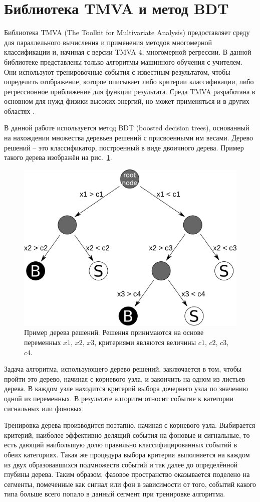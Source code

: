 \documentclass[14pt]{extarticle}
\begin{document}
\section{Библиотека TMVA и метод BDT}
Библиотека TMVA (The Toolkit for Multivariate Analysis) предоставляет среду для параллельного вычисления и применения методов многомерной классификации и, начиная с версии TMVA 4, многомерной регрессии. В данной библиотеке представлены только алгоритмы машинного обучения с учителем. Они используют тренировочные события с известным результатом, чтобы определить отображение, которое описывает либо критерии классификации, либо регрессионное приближение для функции результата. Среда TMVA разработана в основном для нужд физики высоких энергий, но может применяться и в других областях \cite{tmva4}.

В данной работе используется метод BDT (boosted decision trees), основанный на нахождении множества деревьев решений с присвоенными им весами. Дерево решений -- это классификатор, построенный в виде двоичного дерева. Пример такого дерева изображён на рис.~\ref{fig:dectree}.

\begin{figure}[h!]
	\centering
	\includegraphics[width=0.7\linewidth]{../pics/decision.png}
	\caption{Пример дерева решений. Решения принимаются на основе переменных $x1$, $x2$, $x3$, критериями являются величины $c1$, $c2$, $c3$, $c4$.}
	\label{fig:dectree}
\end{figure}

Задача алгоритма, использующего дерево решений, заключается в том, чтобы пройти это дерево, начиная с корневого узла, и закончить на одном из листьев дерева. В каждом узле находится критерий выбора дочернего узла по значению одной из переменных. В результате алгоритм относит событие к категории сигнальных или фоновых.

Тренировка дерева производится поэтапно, начиная с корневого узла. Выбирается критерий, наиболее эффективно делящий события на фоновые и сигнальные, то есть дающий наибольшую долю правильно классифицированных событий в обеих категориях. Такая же процедура выбора критерия выполняется на каждом из двух образовавшихся подмножеств событий и так далее до определённой глубины дерева. Таким образом, фазовое пространство оказывается поделено на сегменты, помеченные как сигнал или фон в зависимости от того, событий какого типа больше всего попало в данный сегмент при тренировке алгоритма.
\end{document}
